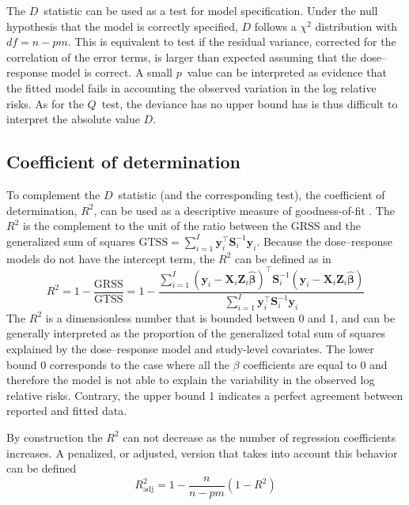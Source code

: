 \documentclass[11pt,a4paper,twoside,openany]{book}\usepackage{knitr}
\begin{document}
{\noindent The $D$~statistic can be used as a test for model specification. Under the null hypothesis that the model is correctly specified, $D$ follows a $\chi^2$ distribution with $df = n - pm$. This is equivalent to test if the residual variance, corrected for the correlation of the error terms, is larger than expected assuming that the dose--response model is correct. A small $p$~value can be interpreted as evidence that the fitted model fails in accounting the observed variation in the log relative risks. As for the $Q$~test, the deviance has no upper bound has is thus difficult to interpret the absolute value $D$.

\subsection{Coefficient of determination}

To complement the $D$~statistic (and the corresponding test), the coefficient of determination, $R^2$, can be used as a descriptive measure of goodness-of-fit \citep{hagquist1998goodness, kvaalseth1985cautionary}. The $R^2$ is the complement to the unit of the ratio between the $\textrm{GRSS}$ and the generalized sum of squares $\textrm{GTSS} = \sum_{i=1}^I\mathbf{y}_i^\top \mathbf{S}_i^{-1} \mathbf{y}_i$. Because the dose--response models do not have the intercept term, the $R^2$ can be defined as in \cite{buse1973goodness, theil1958economic}
\begin{equation}
R^2 = 1 - \frac{\textrm{GRSS}}{\textrm{GTSS}} = 1 - \frac{\sum_{i=1}^I \left(\mathbf{y}_i - \mathbf{X}_i \mathbf{Z}_i \boldsymbol{\hat \beta} \right)^\top \mathbf{S}_i^{-1} \left(\mathbf{y}_i - \mathbf{X}_i \mathbf{Z}_i \boldsymbol{\hat \beta} \right)}{\sum_{i=1}^I \mathbf{y}_i^\top \mathbf{S}_i^{-1} \mathbf{y}_i}
\label{eq:R2}
\end{equation}
\noindent The $R^2$ is a dimensionless number that is bounded between 0 and 1, and can be generally interpreted as the proportion of the generalized total sum of squares explained by the dose--response model and study-level covariates. The lower bound 0 corresponds to the case where all the $\beta$ coefficients are equal to 0 and therefore the model is not able to explain the variability in the observed log relative risks. Contrary, the upper bound 1 indicates a perfect agreement between reported and fitted data. 

By construction the $R^2$ can not decrease as the number of regression coefficients increases. A penalized, or adjusted, version that takes into account this behavior can be defined
\begin{equation}
R^2_{\textrm{adj}} = 1 - \frac{n}{n-pm} \left(1 - R^2 \right)
\label{eq:R2adj}
\end{equation}

}
\end{document}
